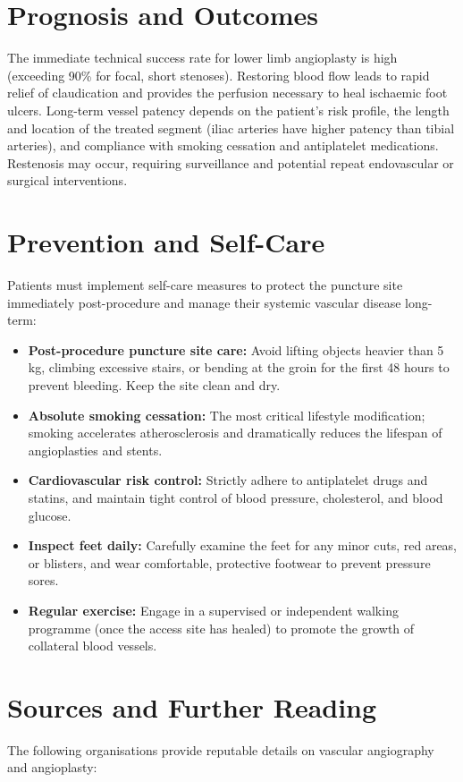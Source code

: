 \section*{Prognosis and Outcomes}
The immediate technical success rate for lower limb angioplasty is high (exceeding 90\% for focal, short stenoses). Restoring blood flow leads to rapid relief of claudication and provides the perfusion necessary to heal ischaemic foot ulcers. Long-term vessel patency depends on the patient's risk profile, the length and location of the treated segment (iliac arteries have higher patency than tibial arteries), and compliance with smoking cessation and antiplatelet medications. Restenosis may occur, requiring surveillance and potential repeat endovascular or surgical interventions.

\section*{Prevention and Self-Care}
Patients must implement self-care measures to protect the puncture site immediately post-procedure and manage their systemic vascular disease long-term:

\begin{itemize}
    \item \textbf{Post-procedure puncture site care:} Avoid lifting objects heavier than 5 kg, climbing excessive stairs, or bending at the groin for the first 48 hours to prevent bleeding. Keep the site clean and dry.
    \item \textbf{Absolute smoking cessation:} The most critical lifestyle modification; smoking accelerates atherosclerosis and dramatically reduces the lifespan of angioplasties and stents.
    \item \textbf{Cardiovascular risk control:} Strictly adhere to antiplatelet drugs and statins, and maintain tight control of blood pressure, cholesterol, and blood glucose.
    \item \textbf{Inspect feet daily:} Carefully examine the feet for any minor cuts, red areas, or blisters, and wear comfortable, protective footwear to prevent pressure sores.
    \item \textbf{Regular exercise:} Engage in a supervised or independent walking programme (once the access site has healed) to promote the growth of collateral blood vessels.
\end{itemize}

\section*{Sources and Further Reading}
The following organisations provide reputable details on vascular angiography and angioplasty:

